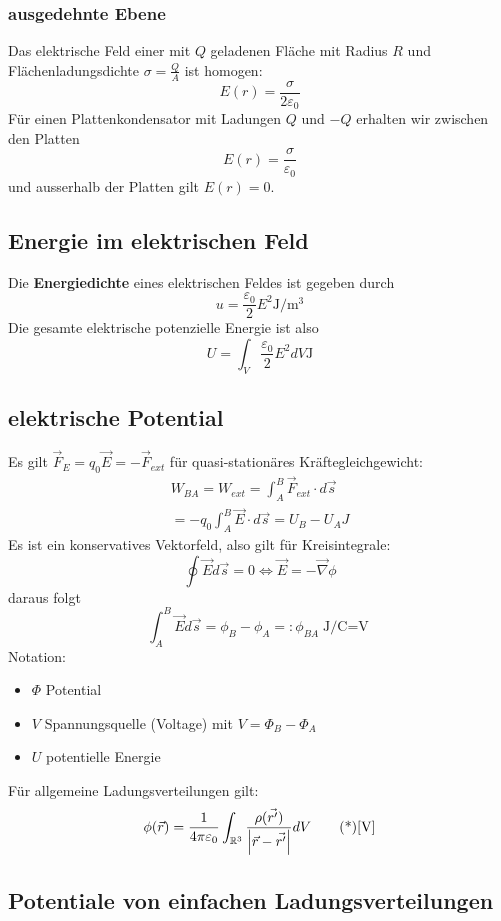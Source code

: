 \subsubsection{ausgedehnte Ebene}
Das elektrische Feld einer mit $Q$ geladenen Fläche mit Radius $R$ und Flächenladungsdichte $\sigma = \frac{Q}{A}$ ist homogen:
$$E(r) = \frac{\sigma}{2 \varepsilon_0}$$
Für einen Plattenkondensator mit Ladungen $Q$ und $-Q$ erhalten wir zwischen den Platten
$$E(r) = \frac{\sigma}{\varepsilon_0}$$
und ausserhalb der Platten gilt $E(r) = 0$.

\subsection{Energie im elektrischen Feld}
Die \textbf{Energiedichte} eines elektrischen Feldes ist gegeben durch 
\[u = \frac{\varepsilon_0}{2}E^2\unit{\joule\per \meter \cubed}\]
Die gesamte elektrische potenzielle Energie ist also
\[U = \int_V \frac{\varepsilon_0}{2}E^2 dV \unit{\joule}\]

\subsection{elektrische Potential}
Es gilt $\Vec{F}_E= q_0\Vec{E} = -\Vec{F}_{ext}$ für quasi-stationäres Kräftegleichgewicht:
\begin{multline*}
    W_{BA} = W_{ext} = \int_A^B\Vec{F}_{ext} \cdot d\Vec{s}\\ = -q_0 \int_A^B \Vec{E}\cdot d\Vec{s} = U_B - U_A \unit{J}
\end{multline*}
Es ist ein konservatives Vektorfeld, also gilt für Kreisintegrale:
$$\oint \vec{E}d\vec{s} = 0 \Leftrightarrow \vec{E} = -\vec{\nabla}\phi$$
daraus folgt
\[\int_A^B\vec{E}d\vec{s} = \phi_B - \phi_A =: \phi_{BA} \unit{\joule \per \coulomb = \volt}\]
Notation:
\begin{itemize}
    \item $\Phi$ Potential
    \item $V$ Spannungsquelle (Voltage) mit $V = \Phi_B - \Phi_A$
    \item $U$ potentielle Energie
\end{itemize}

Für allgemeine Ladungsverteilungen gilt:
\[\phi(\vec{r}) = \frac{1}{4\pi \varepsilon_0}\int_{\R^3}\frac{\rho(\vec{r'})}{\abs{\vec{r}-\vec{r'}}} dV \unit{\volt}\]


\subsection{Potentiale von einfachen Ladungsverteilungen}

